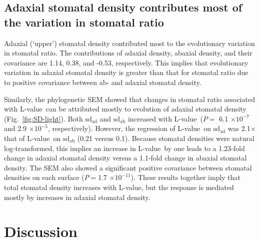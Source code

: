\documentclass[12pt, oneside]{article}
\newcommand{\el}{L-value}
\begin{document}
\subsection*{Adaxial stomatal density contributes most of the variation in stomatal ratio}

Adaxial (`upper') stomatal density contributed most to the evolutionary variation in stomatal ratio. The contributions of adaxial density, abaxial density, and their covariance are 1.14, 0.38, and -0.53, respectively. This implies that evolutionary variation in adaxial stomatal density is greater than that for stomatal ratio due to positive covariance between ab- and adaxial stomatal density.

Similarly, the phylogenetic SEM showed that changes in stomatal ratio associated with \el~can be attributed mostly to evolution of adaxial stomatal density (Fig.~\ref{fig:SD-light}). Both $\mathrm{sd_{ad}}$ and $\mathrm{sd_{ab}}$ increased with \el~($P =$ 6.1 $\times10^{-7}$ and 2.9 $\times10^{-5}$, respectively). However, the regression of \el~on $\mathrm{sd_{ad}}$ was 2.1$\times$ that of \el~on $\mathrm{sd_{ab}}$ (0.21 versus 0.1). Because stomatal densities were natural log-transformed, this implies an increase in \el~by one leads to a 1.23-fold change in adaxial stomatal density versus a 1.1-fold change in abaxial stomatal density. The SEM also showed a significant positive covariance between stomatal densities on each surface ($P = $1.7 $\times10^{-11}$). These results together imply that total stomatal density increases with \el, but the response is mediated mostly by increases in adaxial stomatal density.



\section*{Discussion}
\end{document}
